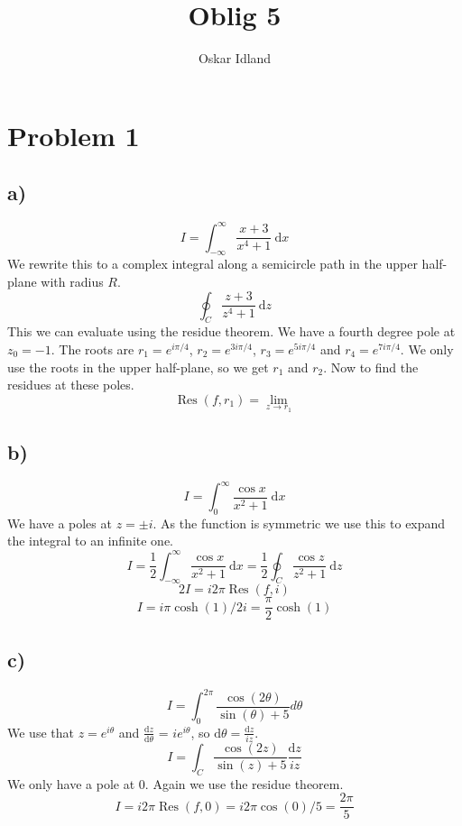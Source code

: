\documentclass{article}
\author{Oskar Idland}
\title{Oblig 5}
\date{}
\begin{document}
\maketitle
\newpage
\section*{Problem 1}
\subsection*{a)}
\[
I = ∫_{-∞}^{∞} \frac{x+3}{x^{4} + 1} \ \mathrm{d}x
\]
We rewrite this to a complex integral along a semicircle path in the upper half-plane with radius $R$. 
\[
∮_{C} \frac{z+3}{z^{4} + 1} \ \mathrm{d}z
\]
This we can evaluate using the residue theorem. We have a fourth degree pole at $z_0 = -1$. The roots are $r_1 = e^{iπ/ 4}$, $r_2 = e^{3iπ/ 4}$, $r_3 = e^{5iπ/ 4}$ and $r_4 = e^{7iπ/ 4}$. We only use the roots in the upper half-plane, so we get $r_1$ and $r_2$. Now to find the residues at these poles.
\[
\operatorname{Res}(f, r_1) = \lim_{z \to r_1}
\]




\subsection*{b)}
\[
I = ∫_{0}^{∞} \frac{\cos x}{x^2 + 1} \ \mathrm{d}x
\]
We have a poles at $z = \pm i$. As the function is symmetric we use this to expand the integral to an infinite one. 
\[
I = \frac{1}{2} ∫_{-∞}^{∞} \frac{\cos x}{x^2 + 1} \ \mathrm{d}x = \frac{1}{2} ∮_{C} \frac{\cos z}{z^2 + 1} \ \mathrm{d}z
\]
\[
2I = i 2π \operatorname{Res}(f, i)
\]
\[
I = i π \cosh(1) / 2i = \frac{π}{2} \cosh(1)
\]

\subsection*{c)}
\[
I = ∫_{0}^{2π} \frac{\cos (2θ)}{\sin (θ) + 5} dθ
\]
We use that $z = e^{iθ}$ and $\frac{\mathrm{d}z}{\mathrm{d}θ}$ = $ie^{iθ}$, so $\mathrm{d}θ = \frac{\mathrm{d}z}{iz}$. 
\[
I = ∫_{C} \frac{\cos (2z)}{\sin (z) + 5} \frac{\mathrm{d}z}{iz}
\]
We only have a pole at 0. Again we use the residue theorem.
\[
I = i 2π \operatorname{Res}(f, 0) = i 2π \cos(0) / 5 = \frac{2π}{5}
\]
\end{document}
